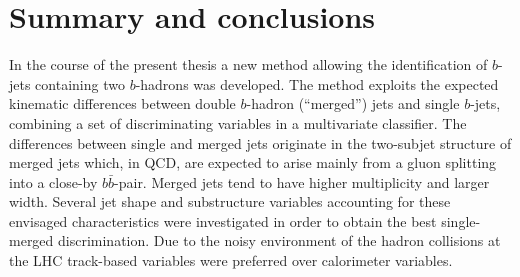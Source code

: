 %
%
\chapter{Summary and conclusions}\label{ch:conclusions}

In the course of the present thesis a new method allowing the identification of $b$-jets containing two $b$-hadrons was developed. %
%
The method exploits the expected kinematic differences between double $b$-hadron (``merged'') jets and single $b$-jets, combining a set of discriminating variables in a multivariate classifier.  The differences between single and merged jets originate in the two-subjet structure of merged jets which, in QCD, are expected to arise mainly from a gluon splitting into a  close-by $b\bar{b}$-pair. 
Merged jets tend to have higher multiplicity and larger width. Several jet shape and substructure variables accounting for these envisaged characteristics were investigated in order to obtain the best single-merged discrimination.  Due to the noisy environment of the hadron collisions at the LHC track-based variables were preferred over calorimeter variables.   %

